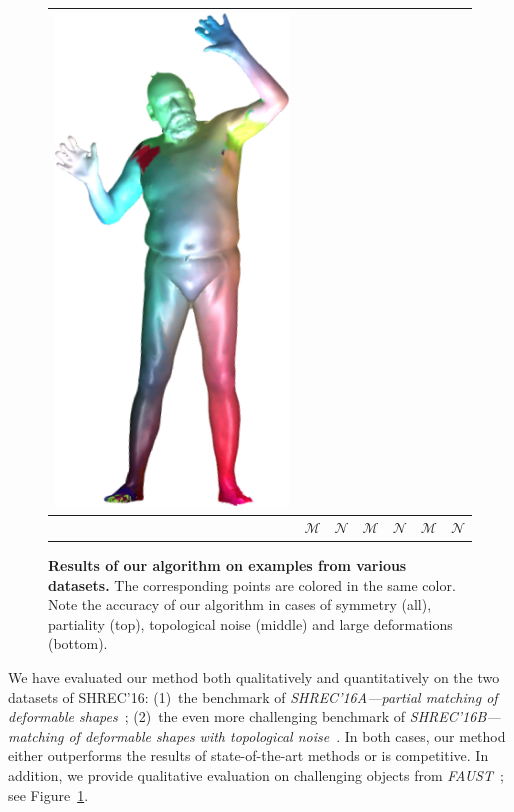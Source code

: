 \begin{figure}[b!]
\begin{tabular}[width=0.8\textwidth]{c|cc|cc|cc|}
		\includegraphics[scale=0.43]{figures/test_scan_051_test_scan_050.png}%
		\\ \hline
		& $\mathcal{M}$ & $\mathcal{N}$ & $\mathcal{M}$ & $\mathcal{N}$ & $\mathcal{M}$ & $\mathcal{N}$ %
	\end{tabular}
	\caption{{\textbf {Results of our algorithm on examples from various datasets.}} 
			The corresponding points are colored in the same color.
			Note the accuracy of our algorithm in cases of symmetry (all), partiality (top), topological noise (middle) and large deformations (bottom).	
	}
	\label{fig:Shrec16Qualitative2}
\end{figure}

We have evaluated our method both qualitatively and quantitatively on the two datasets of SHREC'16:
(1)~the benchmark of {\em SHREC'16A---partial matching of deformable shapes}~\cite{cosmo2016shrec};
(2)~the even more challenging benchmark of {\em SHREC'16B---matching of deformable shapes with topological noise}~\cite{lahner2016shrec}.
In both cases, our method either outperforms the results of state-of-the-art methods or is competitive.
In addition, we provide qualitative evaluation on challenging objects from {\em FAUST}~\cite{bogo2014faust};
see Figure~\ref{fig:Shrec16Qualitative2}.

